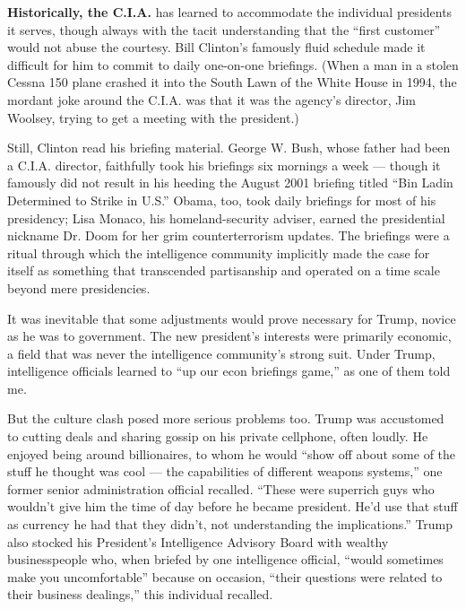 \textbf{Historically, the C.I.A.} has learned to accommodate the
individual presidents it serves, though always with the tacit
understanding that the ``first customer'' would not abuse the courtesy.
Bill Clinton's famously fluid schedule made it difficult for him to
commit to daily one-on-one briefings. (When a man in a stolen Cessna 150
plane crashed it into the South Lawn of the White House in 1994, the
mordant joke around the C.I.A. was that it was the agency's director,
Jim Woolsey, trying to get a meeting with the president.)

Still, Clinton read his briefing material. George W. Bush, whose father
had been a C.I.A. director, faithfully took his briefings six mornings a
week --- though it famously did not result in his heeding the August
2001 briefing titled ``Bin Ladin Determined to Strike in U.S.'' Obama,
too, took daily briefings for most of his presidency; Lisa Monaco, his
homeland-security adviser, earned the presidential nickname Dr. Doom for
her grim counterterrorism updates. The briefings were a ritual through
which the intelligence community implicitly made the case for itself as
something that transcended partisanship and operated on a time scale
beyond mere presidencies.

It was inevitable that some adjustments would prove necessary for Trump,
novice as he was to government. The new president's interests were
primarily economic, a field that was never the intelligence community's
strong suit. Under Trump, intelligence officials learned to ``up our
econ briefings game,'' as one of them told me.

But the culture clash posed more serious problems too. Trump was
accustomed to cutting deals and sharing gossip on his private cellphone,
often loudly. He enjoyed being around billionaires, to whom he would
``show off about some of the stuff he thought was cool --- the
capabilities of different weapons systems,'' one former senior
administration official recalled. ``These were superrich guys who
wouldn't give him the time of day before he became president. He'd use
that stuff as currency he had that they didn't, not understanding the
implications.'' Trump also stocked his President's Intelligence Advisory
Board with wealthy businesspeople who, when briefed by one intelligence
official, ``would sometimes make you uncomfortable'' because on
occasion, ``their questions were related to their business dealings,''
this individual recalled.

